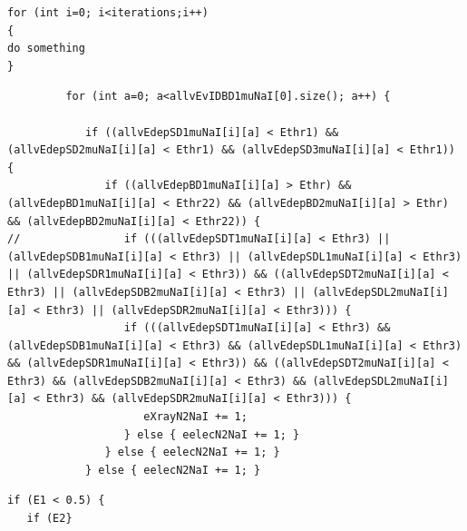 \documentclass[12pt]{article}
\begin{document}
\begin{lstlisting}
for (int i=0; i<iterations;i++)
{
do something
}
\end{lstlisting}

\begin{lstlisting}
		 for (int a=0; a<allvEvIDBD1muNaI[0].size(); a++) {

		    if ((allvEdepSD1muNaI[i][a] < Ethr1) && (allvEdepSD2muNaI[i][a] < Ethr1) && (allvEdepSD3muNaI[i][a] < Ethr1)) {
		       if ((allvEdepBD1muNaI[i][a] > Ethr) && (allvEdepBD1muNaI[i][a] < Ethr22) && (allvEdepBD2muNaI[i][a] > Ethr) && (allvEdepBD2muNaI[i][a] < Ethr22)) {
//			      if (((allvEdepSDT1muNaI[i][a] < Ethr3) || (allvEdepSDB1muNaI[i][a] < Ethr3) || (allvEdepSDL1muNaI[i][a] < Ethr3) || (allvEdepSDR1muNaI[i][a] < Ethr3)) && ((allvEdepSDT2muNaI[i][a] < Ethr3) || (allvEdepSDB2muNaI[i][a] < Ethr3) || (allvEdepSDL2muNaI[i][a] < Ethr3) || (allvEdepSDR2muNaI[i][a] < Ethr3))) {
			      if (((allvEdepSDT1muNaI[i][a] < Ethr3) && (allvEdepSDB1muNaI[i][a] < Ethr3) && (allvEdepSDL1muNaI[i][a] < Ethr3) && (allvEdepSDR1muNaI[i][a] < Ethr3)) && ((allvEdepSDT2muNaI[i][a] < Ethr3) && (allvEdepSDB2muNaI[i][a] < Ethr3) && (allvEdepSDL2muNaI[i][a] < Ethr3) && (allvEdepSDR2muNaI[i][a] < Ethr3))) {
				     eXrayN2NaI += 1;
				  } else { eelecN2NaI += 1; }
			   } else { eelecN2NaI += 1; }
		    } else { eelecN2NaI += 1; }
\end{lstlisting}

\begin{lstlisting}
if (E1 < 0.5) {
   if (E2}
\end{lstlisting}
\end{document}
